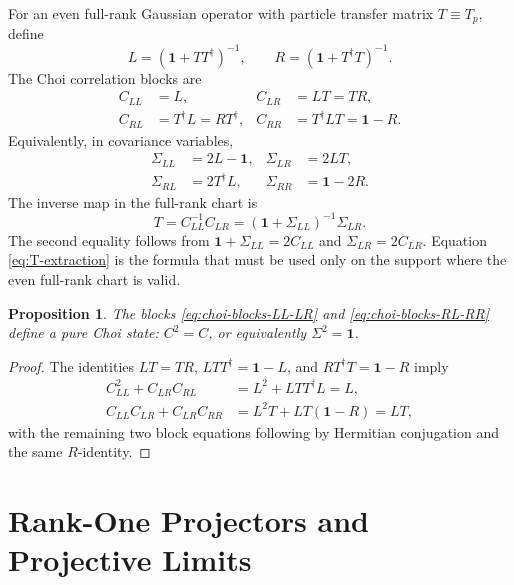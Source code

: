 \documentclass[aps,prb,onecolumn,nofootinbib,superscriptaddress]{revtex4-2}
\newcommand{\I}{\mathbf{1}}
\theoremstyle{plain}
\newtheorem{proposition}{Proposition}
\theoremstyle{definition}
\begin{document}
For an even full-rank Gaussian operator with particle transfer matrix
\(T\equiv T_p\), define
\begin{equation}
  L=(\I+TT^\dagger)^{-1},
  \qquad
  R=(\I+T^\dagger T)^{-1}.
  \label{eq:L-R-def}
\end{equation}
The Choi correlation blocks are
\begin{align}
  C_{LL}&=L,
  &
  C_{LR}&=LT=TR,
  \label{eq:choi-blocks-LL-LR}\\
  C_{RL}&=T^\dagger L=RT^\dagger,
  &
  C_{RR}&=T^\dagger LT=\I-R .
  \label{eq:choi-blocks-RL-RR}
\end{align}
Equivalently, in covariance variables,
\begin{align}
  \Sigma_{LL}&=2L-\I,
  &
  \Sigma_{LR}&=2LT,
  \label{eq:sigma-blocks-LL-LR}\\
  \Sigma_{RL}&=2T^\dagger L,
  &
  \Sigma_{RR}&=\I-2R .
  \label{eq:sigma-blocks-RL-RR}
\end{align}
The inverse map in the full-rank chart is
\begin{equation}
  T=C_{LL}^{-1}C_{LR}
  =
  (\I+\Sigma_{LL})^{-1}\Sigma_{LR}.
  \label{eq:T-extraction}
\end{equation}
The second equality follows from \(\I+\Sigma_{LL}=2C_{LL}\) and
\(\Sigma_{LR}=2C_{LR}\).  Equation \eqref{eq:T-extraction} is the formula that
must be used only on the support where the even full-rank chart is valid.

\begin{proposition}
The blocks \eqref{eq:choi-blocks-LL-LR} and
\eqref{eq:choi-blocks-RL-RR} define a pure Choi state:
\(C^2=C\), or equivalently \(\Sigma^2=\I\).
\end{proposition}

\begin{proof}
The identities \(LT=TR\), \(LTT^\dagger=\I-L\), and
\(RT^\dagger T=\I-R\) imply
\begin{align}
  C_{LL}^2+C_{LR}C_{RL}
  &=
  L^2+LTT^\dagger L
  =
  L,\\
  C_{LL}C_{LR}+C_{LR}C_{RR}
  &=
  L^2T+LT(\I-R)
  =
  LT,
\end{align}
with the remaining two block equations following by Hermitian conjugation and
the same \(R\)-identity.
\end{proof}

\section{Rank-One Projectors and Projective Limits}
\end{document}

